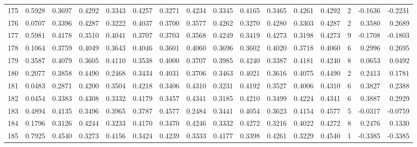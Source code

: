 \begin{tabular}{lrrrrrrrrrrrrrrr}
175 &      0.5928 &  0.3697 &  0.4292 &  0.3343 &  0.4257 &  0.3271 &  0.4234 &  0.3345 &  0.4165 &  0.3465 &   0.4261 &     0.4292 &      2 &                   -0.1636 &                    -0.2231 \\
176 &      0.0707 &  0.3396 &  0.4287 &  0.3222 &  0.4037 &  0.3700 &  0.3577 &  0.4262 &  0.3270 &  0.4280 &   0.3303 &     0.4287 &      2 &                    0.3580 &                     0.2689 \\
177 &      0.5981 &  0.4178 &  0.3510 &  0.4041 &  0.3707 &  0.3703 &  0.3568 &  0.4249 &  0.3419 &  0.4273 &   0.3198 &     0.4273 &      9 &                   -0.1708 &                    -0.1803 \\
178 &      0.1064 &  0.3759 &  0.4049 &  0.3643 &  0.4046 &  0.3601 &  0.4060 &  0.3696 &  0.3602 &  0.4020 &   0.3718 &     0.4060 &      6 &                    0.2996 &                     0.2695 \\
179 &      0.3587 &  0.4079 &  0.3605 &  0.4110 &  0.3538 &  0.4000 &  0.3707 &  0.3985 &  0.4240 &  0.3387 &   0.4181 &     0.4240 &      8 &                    0.0653 &                     0.0492 \\
180 &      0.2077 &  0.3858 &  0.4490 &  0.2468 &  0.3434 &  0.4031 &  0.3706 &  0.3463 &  0.4021 &  0.3616 &   0.4075 &     0.4490 &      2 &                    0.2413 &                     0.1781 \\
181 &      0.0483 &  0.2871 &  0.4200 &  0.3504 &  0.4218 &  0.3406 &  0.4310 &  0.3231 &  0.4192 &  0.3527 &   0.4006 &     0.4310 &      6 &                    0.3827 &                     0.2388 \\
182 &      0.0454 &  0.3383 &  0.4308 &  0.3332 &  0.4179 &  0.3457 &  0.4341 &  0.3185 &  0.4210 &  0.3499 &   0.4224 &     0.4341 &      6 &                    0.3887 &                     0.2929 \\
183 &      0.4894 &  0.4135 &  0.3496 &  0.3965 &  0.3787 &  0.4577 &  0.2484 &  0.3441 &  0.4054 &  0.3623 &   0.4154 &     0.4577 &      5 &                   -0.0317 &                    -0.0759 \\
184 &      0.1796 &  0.3126 &  0.4244 &  0.3233 &  0.4170 &  0.3470 &  0.4246 &  0.3332 &  0.4272 &  0.3216 &   0.4022 &     0.4272 &      8 &                    0.2476 &                     0.1330 \\
185 &      0.7925 &  0.4540 &  0.3273 &  0.4156 &  0.3424 &  0.4239 &  0.3333 &  0.4177 &  0.3398 &  0.4261 &   0.3229 &     0.4540 &      1 &                   -0.3385 &                    -0.3385 \\

\end{tabular}
